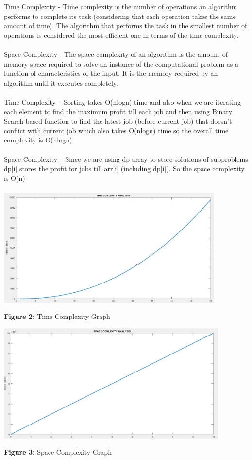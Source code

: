 \documentclass[10pt]{article}
\begin{document}
\begin{multicols*}{2}
Time Complexity - Time complexity is the number of operations an algorithm performs to complete its task (considering that each operation takes the same amount of time). The algorithm that performs the task in the smallest number of operations is considered the most efficient one in terms of the time complexity.\\\\Space Complexity - The space complexity of an algorithm is the amount of memory space required to solve an instance of the computational problem as a function of characteristics of the input. It is the memory required by an algorithm until it executes completely.\\\\Time Complexity – Sorting takes O(nlogn) time and also when we are iterating each element to find the maximum profit till each job and then using Binary Search based function to find the latest job (before current job) that doesn't conflict with current job which also takes O(nlogn) time so the overall time complexity is O(nlogn).\\\\Space Complexity – Since we are using dp array to store solutions of subproblems dp[i] stores the profit for jobs till arr[i] (including dp[i]). So the space complexity is O(n)\\\\
\includegraphics[width=\columnwidth, height=6cm]{Time Complexity.png}\begin{center}\textbf{Figure 2:} Time Complexity Graph\end{center}
\includegraphics[width=\columnwidth, height=6cm]{Space Complexity.png}\begin{center}\textbf{Figure 3:} Space Complexity Graph\end{center}


\end{multicols*}
\end{document}
